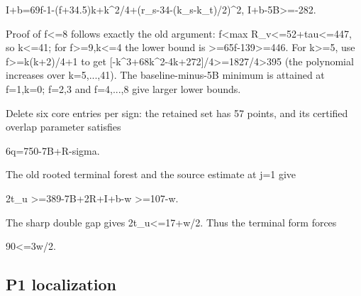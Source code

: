 \documentclass[10pt,a4paper]{article}
\theoremstyle{definition}
\begin{document}
I+\allowbreak{}b=\allowbreak{}69f-1-(f+\allowbreak{}34.5)k+\allowbreak{}k\^{}2/4+\allowbreak{}(r\_\allowbreak{}s-34-(k\_\allowbreak{}s-k\_\allowbreak{}t)/2)\^{}2,\allowbreak{}
I+\allowbreak{}b-5B\textgreater=\allowbreak{}-282.

Proof of f\textless=\allowbreak{}8 follows exactly the old argument: f\textless max
R\_\allowbreak{}v\textless=\allowbreak{}52+\allowbreak{}tau\textless=\allowbreak{}447,\allowbreak{} so k\textless=\allowbreak{}41; for
f\textgreater=\allowbreak{}9,\allowbreak{}k\textless=\allowbreak{}4 the lower bound is
\textgreater=\allowbreak{}65f-139\textgreater=\allowbreak{}446. For k\textgreater=\allowbreak{}5,\allowbreak{} use
f\textgreater=\allowbreak{}k(k+\allowbreak{}2)/4+\allowbreak{}1 to get
{[}-k\^{}3+\allowbreak{}68k\^{}2-4k+\allowbreak{}272{]}/4\textgreater=\allowbreak{}1827/4\textgreater395 (the
polynomial increases over k=\allowbreak{}5,\allowbreak{}...,\allowbreak{}41). The baseline-minus-5B minimum is
attained at f=\allowbreak{}1,\allowbreak{}k=\allowbreak{}0; f=\allowbreak{}2,\allowbreak{}3 and f=\allowbreak{}4,\allowbreak{}...,\allowbreak{}8 give larger lower bounds.

Delete six core entries per sign: the retained set has 57 points,\allowbreak{} and
its certified overlap parameter satisfies

6q=\allowbreak{}750-7B+\allowbreak{}R-sigma.

The old rooted terminal forest and the source estimate at j=\allowbreak{}1 give

2t\_\allowbreak{}u \textgreater=\allowbreak{}389-7B+\allowbreak{}2R+\allowbreak{}I+\allowbreak{}b-w \textgreater=\allowbreak{}107-w.

The sharp double gap gives 2t\_\allowbreak{}u\textless=\allowbreak{}17+\allowbreak{}w/2. Thus the terminal form
forces

90\textless=\allowbreak{}3w/2.

\hypertarget{p1-localization}{%
\subsection{P1 localization}\label{p1-localization}}
\end{document}

